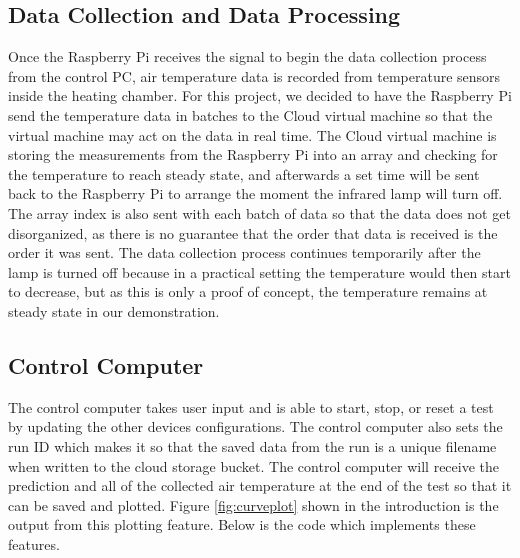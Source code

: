 \documentclass{article}
\begin{document}
\subsection{Data Collection and Data Processing} \label{data_collection} 
Once the Raspberry Pi receives the signal to begin the data collection process from the control PC, air temperature data is recorded from temperature sensors inside the heating chamber. For this project, we decided to have the Raspberry Pi send the temperature data in batches to the Cloud virtual machine so that the virtual machine may act on the data in real time. The Cloud virtual machine is storing the measurements from the Raspberry Pi into an array and checking for the temperature to reach steady state, and afterwards a set time will be sent back to the Raspberry Pi to arrange the moment the infrared lamp will turn off. The array index is also sent with each batch of data so that the data does not get disorganized, as there is no guarantee that the order that data is received is the order it was sent. The data collection process continues temporarily after the lamp is turned off because in a practical setting the temperature would then start to decrease, but as this is only a proof of concept, the temperature remains at steady state in our demonstration. 



\subsection{Control Computer}
The control computer takes user input and is able to start, stop, or reset a test by updating the other devices configurations. The control computer also sets the run ID which makes it so that the saved data from the run is a unique filename when written to the cloud storage bucket. The control computer will receive the prediction and all of the collected air temperature at the end of the test so that it can be saved and plotted. Figure \ref{fig:curveplot} shown in the introduction is the output from this plotting feature. Below is the code which implements these features.
 
\end{document}
